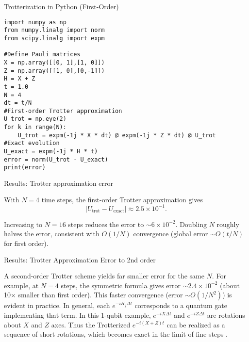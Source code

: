 \documentclass{beamer}
\begin{document}
\begin{frame}[fragile]{Trotterization in Python (First-Order)}

\begin{verbatim}
import numpy as np
from numpy.linalg import norm
from scipy.linalg import expm

#Define Pauli matrices
X = np.array([[0, 1],[1, 0]])
Z = np.array([[1, 0],[0,-1]])
H = X + Z
t = 1.0
N = 4
dt = t/N
#First-order Trotter approximation
U_trot = np.eye(2)
for k in range(N):
    U_trot = expm(-1j * X * dt) @ expm(-1j * Z * dt) @ U_trot
#Exact evolution
U_exact = expm(-1j * H * t)
error = norm(U_trot - U_exact)
print(error)
\end{verbatim}
\end{frame}


\begin{frame}{Results: Trotter approximation error}

With $N=4$ time steps, the first-order Trotter approximation gives
\[
|U_{\text{trot}} - U_{\text{exact}}| \approx 2.5\times10^{-1}.
\]


Increasing to $N=16$ steps reduces the error to $\sim6\times10^{-2}$. Doubling $N$ roughly halves the error, consistent with $O(1/N)$ convergence (global error $\sim O(t/N)$ for first order).
\end{frame}

\begin{frame}{Results: Trotter Approximation Error to 2nd order}

 A second-order Trotter scheme yields far smaller error for the same
$N$. For example, at $N=4$ steps, the symmetric formula gives error
$\sim2.4\times10^{-2}$ (about 10× smaller than first order). This
faster convergence (error $\sim O(1/N^2)$) is evident in practice.  In
general, each $e^{-iH_j \Delta t}$ corresponds to a quantum gate
implementing that term. In this 1-qubit example, $e^{-iX\Delta t}$ and
$e^{-iZ\Delta t}$ are rotations about $X$ and $Z$ axes. Thus the
Trotterized $e^{-i(X+Z)t}$ can be realized as a sequence of short
rotations, which becomes exact in the limit of fine steps . 


\end{frame}
\end{document}
